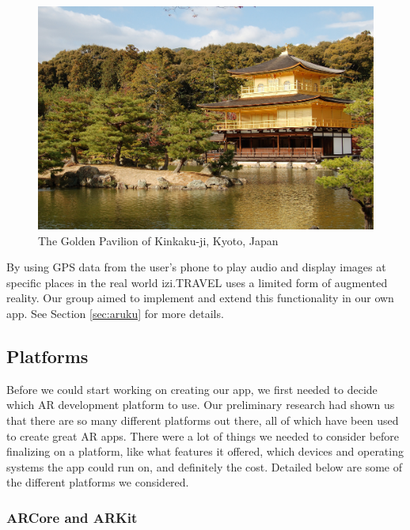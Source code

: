 \documentclass[a4paper, 10pt, american, titlepage]{article}
\begin{document}
\begin{figure}[h]
	\centering
	\includegraphics[width=\textwidth]{kinkakuji.jpg}
	\caption[The Golden Pavilion of Kinkaku-ji, Kyoto, Japan]{The Golden
		Pavilion of Kinkaku-ji, Kyoto, Japan~\autocite{davidson2005}}
	\label{fig:kinkakuji}
\end{figure}

By using GPS data from the user's phone to play audio and display images at
specific places in the real world izi.TRAVEL uses a limited form of augmented
reality. Our group aimed to implement and extend this functionality in our own
app. See Section \ref{sec:aruku} for more details.

\subsection{Platforms}
\label{sec:platforms}

Before we could start working on creating our app, we first needed to decide which
AR development platform to use. Our preliminary research had shown us that there
are so many different platforms out there, all of which have been used to create
great AR apps. There were a lot of things we needed to consider before finalizing
on a platform, like what features it offered, which devices and operating systems the
app could run on, and definitely the cost. Detailed below are some of the different
platforms we considered.

\subsubsection{ARCore and ARKit}
\label{sec:ARCoreAndARKit}
\end{document}
